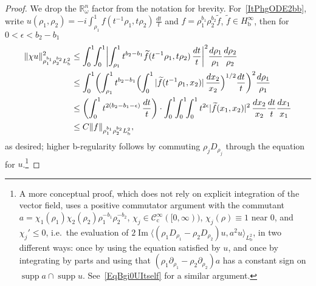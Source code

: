 \documentclass[reqno,11pt,letterpaper]{amsart}
\numberwithin{equation}{section}
\numberwithin{figure}{section}
\theoremstyle{definition}
\theoremstyle{remark}
\newcommand{\mc}{\mathcal}
\newcommand{\cC}{\mc C}
\newcommand{\R}{\mathbb{R}}
\renewcommand{\Im}{\operatorname{Im}}
\newcommand{\supp}{\operatorname{supp}}
\newcommand{\eps}{\epsilon}
\newcommand{\la}{\langle}
\newcommand{\pa}{\partial}
\newcommand{\ra}{\rangle}
\newcommand{\wt}{\widetilde}
\newcommand{\bop}{{\mathrm{b}}}
\newcommand{\cp}{{\mathrm{c}}}
\newcommand{\CIc}{\cC^\infty_\cp}
\newcommand{\Hb}{H_{\bop}}
\begin{document}
\begin{proof}
  We drop the $\R^n_\omega$ factor from the notation for brevity. For~\eqref{ItPhgODE2bb}, write $u(\rho_1,\rho_2)=-i\int_{\rho_1}^1 f(t^{-1}\rho_1,t\rho_2)\,\frac{d t}{t}$ and $f=\rho_1^{b_1}\rho_2^{b_2}\wt f$, $\wt f\in\Hb^\infty$, then for $0<\eps<b_2-b_1$
  \begin{align*}
    \|\chi u\|_{\rho_1^{b_1}\rho_2^{b_2}L^2_\bop}^2 &\leq \int_0^1\!\!\int_0^1 \biggl|\int_{\rho_1}^1 t^{b_2-b_1}\wt f(t^{-1}\rho_1, t\rho_2)\,\frac{d t}{t}\biggr|^2 \frac{d\rho_1}{\rho_1}\frac{d\rho_2}{\rho_2} \\
    &\leq \int_0^1 \biggl(\int_{\rho_1}^1 t^{b_2-b_1} \Bigl(\int_0^1 |\wt f(t^{-1}\rho_1,x_2)|\,\frac{d x_2}{x_2}\Bigr)^{1/2}\frac{d t}{t}\biggr)^2 \frac{d\rho_1}{\rho_1} \\
    &\leq \biggl(\int_0^1 t^{2(b_2-b_1-\eps)}\,\frac{d t}{t}\biggr)\cdot \int_0^1\!\!\int_0^1\!\!\int_0^1 t^{2\eps}|\wt f(x_1,x_2)|^2\,\frac{d x_2}{x_2}\frac{d t}{t}\frac{d x_1}{x_1} \\
    &\leq C\|f\|_{\rho_1^{b_1}\rho_2^{b_2}L^2_\bop},
  \end{align*}
  as desired; higher b-regularity follows by commuting $\rho_j D_{\rho_j}$ through the equation for $u$.\footnote{A more conceptual proof, which does not rely on explicit integration of the vector field, uses a positive commutator argument with the commutant $a=\chi_1(\rho_1)\chi_2(\rho_2)\rho_1^{-b_1}\rho_2^{-b_2}$, $\chi_j\in\CIc([0,\infty))$, $\chi_j(\rho)\equiv 1$ near $0$, and $\chi_j'\leq 0$, i.e.\ the evaluation of $2\Im\la(\rho_1 D_{\rho_1}-\rho_2 D_{\rho_2})u,a^2 u\ra_{L^2_\bop}$, in two different ways: once by using the equation satisfied by $u$, and once by integrating by parts and using that $(\rho_1\pa_{\rho_1}-\rho_2\pa_{\rho_2})a$ has a constant sign on $\supp a\cap\supp u$. See~\eqref{EqBgi0UItself} for a similar argument.}


\end{proof}
\end{document}
